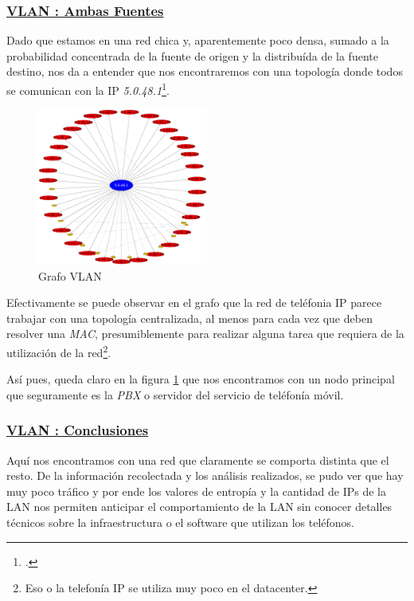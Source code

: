 \subsubsection*{\underline{VLAN : Ambas Fuentes}}\label{subsubsec:vlan40_src_dst}
\par Dado que estamos en una red chica y, aparentemente poco densa, sumado a la
probabilidad concentrada de la fuente de origen y la distribu\'ida de la fuente destino,
nos da a entender que nos encontraremos con una topolog\'ia donde todos se comunican
con la IP \textit{5.0.48.1}\footnote{.}.

\begin{figure}[ht]
    \centering
    \includegraphics[width=0.5\textwidth]{img/graph/escenario_1/vlan40/vlan40}
    \caption{Grafo VLAN }
    \label{fig:vlan40_grafo}
\end{figure}

\par Efectivamente se puede observar en el grafo que la red de tel\'efonia
IP parece trabajar con una topolog\'ia centralizada, al menos para cada vez
que deben resolver una \textit{MAC}, presumiblemente para realizar alguna
tarea que requiera de la utilizaci\'on de la red\footnote{Eso o la
telefon\'ia IP se utiliza muy poco en el datacenter.}.

\par As\'i pues, queda claro en la figura \ref{fig:vlan40_grafo} que nos encontramos
con un nodo principal que seguramente es la \textit{PBX} o servidor del
servicio de tel\'efon\'ia m\'ovil.


\subsubsection*{\underline{VLAN : Conclusiones}}\label{subsubsec:vlan40_conclusiones}
\par Aqu\'i nos encontramos con una red que claramente se comporta distinta que el resto.
De la informaci\'on recolectada y los an\'alisis realizados, se pudo ver que
hay muy poco tr\'afico y por ende los valores de entrop\'ia y la cantidad
de IPs de la LAN nos permiten anticipar el comportamiento de la LAN sin
conocer detalles t\'ecnicos sobre la infraestructura o el software que 
utilizan los tel\'efonos.
